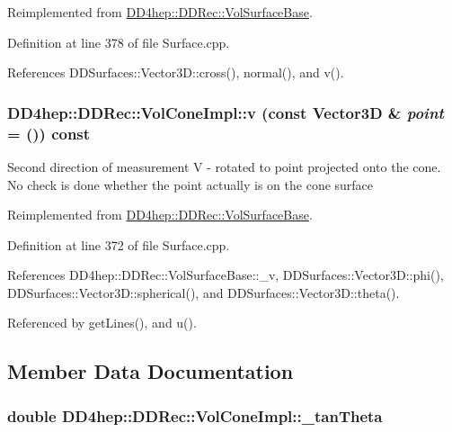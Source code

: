 Reimplemented from \hyperlink{class_d_d4hep_1_1_d_d_rec_1_1_vol_surface_base_a6b72381e54cf0c94ab56db4bdbc8b4a4}{DD4hep::DDRec::VolSurfaceBase}.

Definition at line 378 of file Surface.cpp.

References DDSurfaces::Vector3D::cross(), normal(), and v().\hypertarget{class_d_d4hep_1_1_d_d_rec_1_1_vol_cone_impl_a305c9b455b4e958dbb511f9136ecaf8b}{
\subsubsection[{v}]{ DD4hep::DDRec::VolConeImpl::v (const {\bf Vector3D} \& {\em point} = {()}) const}}
\label{class_d_d4hep_1_1_d_d_rec_1_1_vol_cone_impl_a305c9b455b4e958dbb511f9136ecaf8b}
Second direction of measurement V -\/ rotated to point projected onto the cone. No check is done whether the point actually is on the cone surface 

Reimplemented from \hyperlink{class_d_d4hep_1_1_d_d_rec_1_1_vol_surface_base_a0dd53eec9381d83d0632329223d0b24b}{DD4hep::DDRec::VolSurfaceBase}.

Definition at line 372 of file Surface.cpp.

References DD4hep::DDRec::VolSurfaceBase::\_\-v, DDSurfaces::Vector3D::phi(), DDSurfaces::Vector3D::spherical(), and DDSurfaces::Vector3D::theta().

Referenced by getLines(), and u().

\subsection{Member Data Documentation}
\hypertarget{class_d_d4hep_1_1_d_d_rec_1_1_vol_cone_impl_a5f020df8481dcc088af7a02632f03ae2}{
\subsubsection[{\_\-tanTheta}]{\setlength{\rightskip}{0pt plus 5cm}double {\bf DD4hep::DDRec::VolConeImpl::\_\-tanTheta}}}
\label{class_d_d4hep_1_1_d_d_rec_1_1_vol_cone_impl_a5f020df8481dcc088af7a02632f03ae2}



